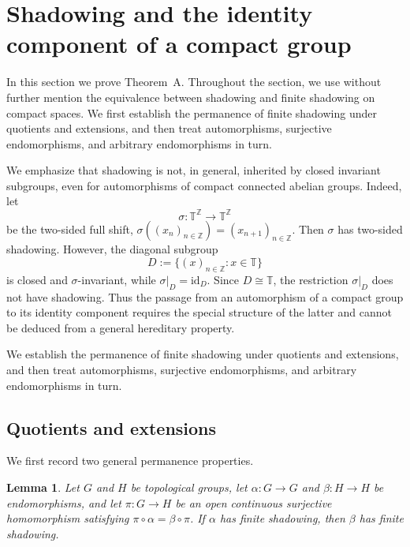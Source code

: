 \documentclass[12pt]{amsart}
\newtheorem{lemma}[theorem]{Lemma}
\theoremstyle{definition}
\numberwithin{equation}{section}
\theoremstyle{remark}
\def\id{{\text{id}}}
\begin{document}
\section{Shadowing and the identity component of a compact group}\label{thA}

In this section we prove Theorem~A. Throughout the section, we use
without further mention the equivalence between shadowing and finite
shadowing on compact spaces. We first establish the permanence of
finite shadowing under quotients and extensions, and then treat
automorphisms, surjective endomorphisms, and arbitrary endomorphisms
in turn.

We emphasize that shadowing is
not, in general, inherited by closed invariant subgroups, even for
automorphisms of compact connected abelian groups. Indeed, let
\[
\sigma:\mathbb T^{\mathbb Z}\longrightarrow\mathbb T^{\mathbb Z}
\]
be the two-sided full shift,
$\sigma((x_n)_{n\in\mathbb Z})=(x_{n+1})_{n\in\mathbb Z}$. Then
$\sigma$ has two-sided shadowing. However, the diagonal subgroup
\[
D:=\{(x)_{n\in\mathbb Z}:x\in\mathbb T\}
\]
is closed and $\sigma$-invariant, while
$\sigma|_D=\id_D$. Since $D\cong\mathbb T$, the restriction
$\sigma|_D$ does not have shadowing. Thus the passage from an
automorphism of a compact group to its identity component requires
the special structure of the latter and cannot be deduced from a
general hereditary property.





We establish the permanence of
finite shadowing under quotients and extensions, and then treat automorphisms,
surjective endomorphisms, and arbitrary endomorphisms in turn.

\subsection{Quotients and extensions}

We first record two general permanence properties.

\begin{lemma}\label{lem:quotient-shadowing}
Let $G$ and $H$ be topological groups, let $\alpha:G\to G$ and
$\beta:H\to H$ be endomorphisms, and let $\pi:G\to H$ be an open continuous surjective homomorphism satisfying
$\pi\circ\alpha=\beta\circ\pi$. If $\alpha$ has finite shadowing, then
$\beta$ has finite shadowing.
\end{lemma}
\end{document}
